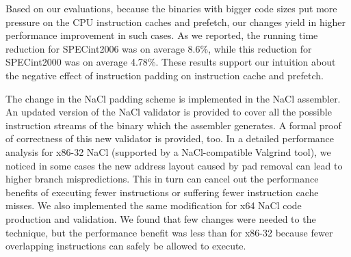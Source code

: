 \documentclass[conference]{IEEEtran}
\begin{document}
Based on our evaluations, because the binaries with bigger code sizes put more pressure on the CPU instruction caches and prefetch, our changes yield in higher performance improvement in such cases. As we reported, the running time reduction for SPECint2006 was on average 8.6\%, while this reduction for SPECint2000 was on average 4.78\%. These results support our intuition about the negative effect of instruction padding on instruction cache and prefetch.


The change in the NaCl padding scheme is implemented in the NaCl assembler. An updated version of the  NaCl validator is provided to cover all the possible instruction streams of the binary which the assembler generates. A formal proof of correctness of this new validator is provided, too. In a detailed performance analysis for x86-32 NaCl (supported by a NaCl-compatible Valgrind tool), we noticed in some cases the new address layout caused by pad removal can lead to higher branch mispredictions. This in turn can cancel out the performance benefits of executing fewer instructions or suffering fewer instruction cache misses.
%
We also implemented the same modification for x64 NaCl code production
and validation.
%
We found that few changes were needed to the technique, but the
performance benefit was less than for x86-32 because fewer overlapping
instructions can safely be allowed to execute.








%
%
\end{document}
